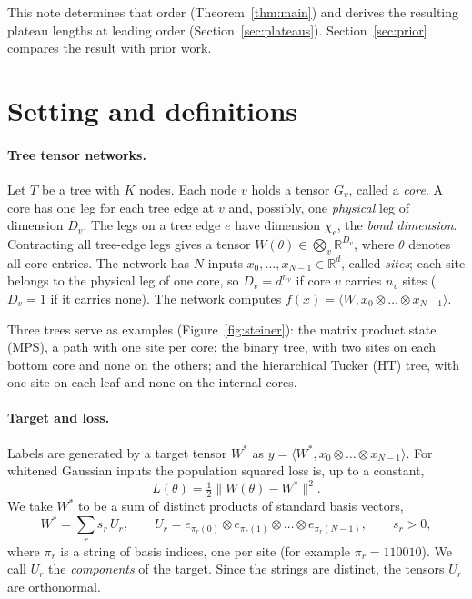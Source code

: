 \documentclass[11pt]{article}
\theoremstyle{definition}
\newcommand{\ip}[2]{\langle #1,#2\rangle}
\begin{document}
This note determines that order (Theorem~\ref{thm:main}) and derives the resulting plateau lengths at leading
order (Section~\ref{sec:plateaus}). Section~\ref{sec:prior} compares the result with prior work.

\section{Setting and definitions}\label{sec:setting}

\paragraph{Tree tensor networks.} Let $T$ be a tree with $K$ nodes. Each node $v$ holds a tensor $G_v$, called a
\emph{core}. A core has one leg for each tree edge at $v$ and, possibly, one \emph{physical} leg of dimension
$D_v$. The legs on a tree edge $e$ have dimension $\chi_e$, the \emph{bond dimension}. Contracting all
tree-edge legs gives a tensor $W(\theta)\in\bigotimes_v\mathbb R^{D_v}$, where $\theta$ denotes all core entries.
The network has $N$ inputs $x_0,\dots,x_{N-1}\in\mathbb R^d$, called \emph{sites}; each site belongs to the physical leg
of one core, so $D_v=d^{n_v}$ if core $v$ carries $n_v$ sites ($D_v=1$ if it carries none). The network computes
$f(x)=\ip{W}{x_0\otimes\dots\otimes x_{N-1}}$.

Three trees serve as examples (Figure~\ref{fig:steiner}): the matrix product state (MPS), a path with one site
per core; the binary tree, with two sites on each bottom core and none on the others; and the hierarchical
Tucker (HT) tree, with one site on each leaf and none on the internal cores.

\paragraph{Target and loss.} Labels are generated by a target tensor $W^*$ as $y=\ip{W^*}{x_0\otimes\dots\otimes x_{N-1}}$.
For whitened Gaussian inputs the population squared loss is, up to a constant,
\begin{equation}
L(\theta)=\tfrac12\lVert W(\theta)-W^*\rVert^2 .
\end{equation}
We take $W^*$ to be a sum of distinct products of standard basis vectors,
\begin{equation}\label{eq:target}
W^*=\sum_{r}s_r\,U_r,\qquad U_r=e_{\pi_r(0)}\otimes e_{\pi_r(1)}\otimes\dots\otimes e_{\pi_r(N-1)},\qquad s_r>0,
\end{equation}
where $\pi_r$ is a string of basis indices, one per site (for example $\pi_r=110010$). We call $U_r$ the
\emph{components} of the target. Since the strings are distinct, the tensors $U_r$ are orthonormal.
\end{document}
